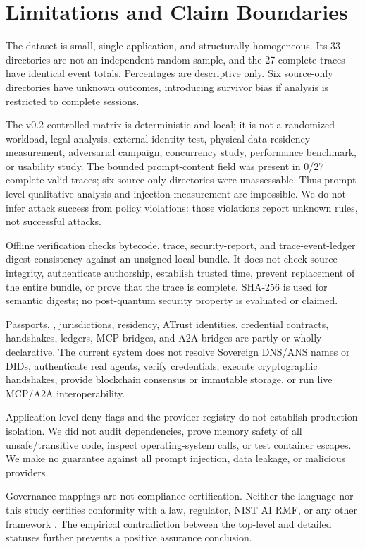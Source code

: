 \section{Limitations and Claim Boundaries}\label{sec:limitations}

The dataset is small, single-application, and structurally homogeneous.  Its 33
directories are not an independent random sample, and the 27 complete traces
have identical event totals.  Percentages are descriptive only.  Six
source-only directories have unknown outcomes, introducing survivor bias if
analysis is restricted to complete sessions.

The v0.2 controlled matrix is deterministic and local; it is not a randomized
workload, legal analysis, external identity test, physical data-residency
measurement, adversarial campaign, concurrency study, performance benchmark,
or usability study.  The bounded prompt-content field was present in 0/27
complete valid traces; six source-only directories were unassessable.  Thus
prompt-level qualitative analysis and injection measurement are impossible.  We
do not infer attack success from policy violations: those violations report
unknown rules, not successful attacks.

Offline verification checks bytecode, trace, security-report, and
trace-event-ledger digest consistency against an unsigned local bundle.  It does not
check source integrity, authenticate authorship, establish trusted time, prevent
replacement of the entire bundle, or prove that the trace is complete.  SHA-256
is used for semantic digests; no post-quantum security property is evaluated
or claimed.

Passports, , jurisdictions, residency, ATrust identities,
credential contracts, handshakes, ledgers, MCP bridges, and A2A bridges are
partly or wholly declarative.  The current system does not resolve Sovereign
DNS/ANS names or DIDs, authenticate real agents, verify credentials, execute
cryptographic handshakes, provide blockchain consensus or immutable storage,
or run live MCP/A2A interoperability.

Application-level deny flags and the provider registry do not establish
production isolation.  We did not audit dependencies, prove memory safety of
all unsafe/transitive code, inspect operating-system calls, or test container
escapes.  We make no guarantee against all prompt injection, data leakage, or
malicious providers.

Governance mappings are not compliance certification.  Neither the language
nor this study certifies conformity with a law, regulator, NIST AI RMF, or any
other framework \citep{tabassi2023airmf}.  The empirical contradiction between
the top-level and detailed statuses further prevents a positive assurance
conclusion.

